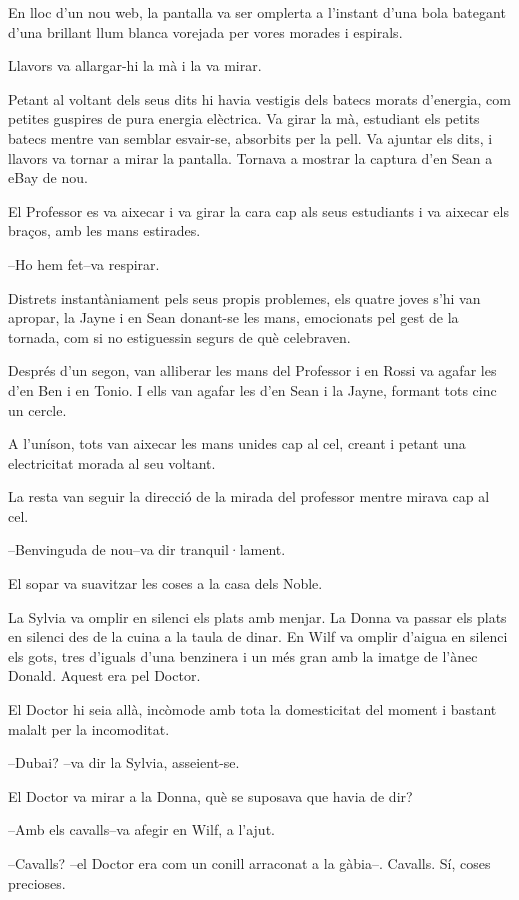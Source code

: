 En lloc d'un nou web, la pantalla va ser omplerta a l'instant d'una bola
bategant d'una brillant llum blanca vorejada per vores morades i
espirals.

Llavors va allargar-hi la mà i la va mirar.

Petant al voltant dels seus dits hi havia vestigis dels batecs morats
d'energia, com petites guspires de pura energia elèctrica. Va girar la
mà, estudiant els petits batecs mentre van semblar esvair-se, absorbits
per la pell. Va ajuntar els dits, i llavors va tornar a mirar la
pantalla. Tornava a mostrar la captura d'en Sean a eBay de nou.

El Professor es va aixecar i va girar la cara cap als seus estudiants i
va aixecar els braços, amb les mans estirades.

--Ho hem fet--va respirar.

Distrets instantàniament pels seus propis problemes, els quatre joves
s'hi van apropar, la Jayne i en Sean donant-se les mans, emocionats pel
gest de la tornada, com si no estiguessin segurs de què celebraven.

Després d'un segon, van alliberar les mans del Professor i en Rossi va
agafar les d'en Ben i en Tonio. I ells van agafar les d'en Sean i la
Jayne, formant tots cinc un cercle.

A l'uníson, tots van aixecar les mans unides cap al cel, creant i petant
una electricitat morada al seu voltant.

La resta van seguir la direcció de la mirada del professor mentre mirava
cap al cel.

--Benvinguda de nou--va dir tranquil·lament.

El sopar va suavitzar les coses a la casa dels Noble.

La Sylvia va omplir en silenci els plats amb menjar. La Donna va passar
els plats en silenci des de la cuina a la taula de dinar. En Wilf va
omplir d'aigua en silenci els gots, tres d'iguals d'una benzinera i un
més gran amb la imatge de l'ànec Donald. Aquest era pel Doctor.

El Doctor hi seia allà, incòmode amb tota la domesticitat del moment i
bastant malalt per la incomoditat.

--Dubai? --va dir la Sylvia, asseient-se.

El Doctor va mirar a la Donna, què se suposava que havia de dir?

--Amb els cavalls--va afegir en Wilf, a l'ajut.

--Cavalls? --el Doctor era com un conill arraconat a la gàbia--.
Cavalls. Sí, coses precioses.

